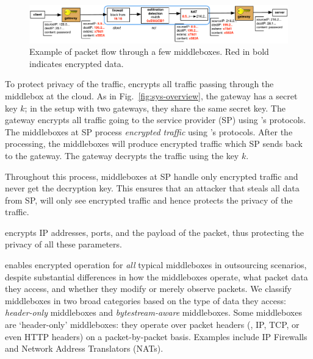 \begin{figure}[t!]
\centering
  \includegraphics[width=6.7in]{fig/packetpath.pdf}
\caption{Example of packet flow through a few middleboxes. Red in bold indicates encrypted data. \label{fig:packetflow}}
\end{figure}



To protect privacy of the traffic, \sys encrypts all traffic passing through the middlebox at the cloud. 
As in Fig.~\ref{fig:sys-overview}, the gateway has a secret key $k$; in the setup with two gateways, they share
the same secret key. The gateway encrypts all traffic going to the service provider (SP) using \sys's protocols.
The middleboxes at SP process {\em encrypted traffic} using \sys's protocols. 
After the processing, the middleboxes
will produce encrypted traffic which SP sends back to the gateway. The gateway decrypts the traffic using the key $k$.

Throughout this process, middleboxes at SP handle only encrypted traffic and never get the decryption key. This ensures
that an attacker that steals all data from SP, will only see encrypted traffic and hence protects the privacy of the 
traffic. 

\sys encrypts IP addresses, ports, and the payload of the packet, thus protecting the privacy of all these parameters. 


\sys enables encrypted operation for {\em all} typical middleboxes in outsourcing scenarios, despite substantial differences in how the middleboxes operate, what packet data they access, and whether they modify or merely observe packets.
  We classify middleboxes in  two broad categories based on the type of data they access: {\em header-only} middleboxes and {\em bytestream-aware} middleboxes.
  Some middleboxes are `header-only' middleboxes: they operate over packet headers (\eg{}, IP, TCP, or even HTTP headers) on a packet-by-packet basis.
Examples  include IP Firewalls and Network Address Translators (NATs).


